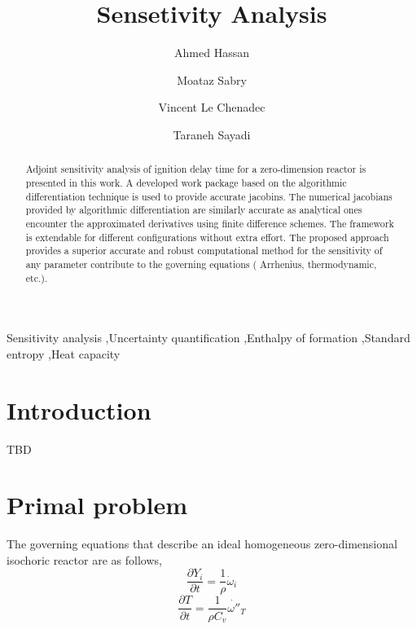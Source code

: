 \documentclass[preprint,review,12pt]{elsarticle}
\begin{document}
\begin{frontmatter}

\title{Sensetivity Analysis}

\author{Ahmed Hassan}
\author{Moataz Sabry}
\author{Vincent Le Chenadec}
\author{Taraneh Sayadi}



\address{Institute for Combustion Technology, RWTH Aachen University, 52064 Aachen, Germany}

\begin{abstract}

Adjoint sensitivity analysis of ignition delay time for a zero-dimension reactor is presented in this work. A developed work package based on the algorithmic differentiation technique is used to provide accurate jacobins. The numerical jacobians provided by algorithmic differentiation are similarly accurate as analytical ones encounter the approximated derivatives using finite difference schemes. The framework is extendable for different configurations without extra effort. The proposed approach provides a superior accurate and robust computational method for the sensitivity of any parameter contribute to the governing equations ( Arrhenius, thermodynamic, etc.).          

\end{abstract}

\begin{keyword}

Sensitivity analysis \sep Uncertainty quantification \sep Enthalpy of formation \sep Standard entropy \sep Heat capacity

\end{keyword}

\end{frontmatter}

\clearpage

\section{Introduction}
\label{Introduction}

TBD
\section{Primal problem}
The governing equations that describe an ideal homogeneous  zero-dimensional isochoric reactor are as follows,
\begin{equation}
\frac{\partial Y_i}{\partial t}=\frac{1}{\rho}\dot{\omega}_i
\end{equation}
\begin{equation}
\frac{\partial T}{\partial t}=\frac{1}{\rho C_v}\dot{\omega''}_T
\end{equation}
\end{document}
